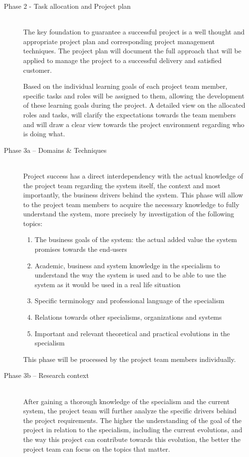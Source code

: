  \begin{description}
	\item [Phase 2 - Task allocation and Project plan]~\\
		The key foundation to guarantee a successful project is a well thought and appropriate project plan and corresponding project management techniques.
		The project plan will document the full approach that will be applied to manage the project to a successful delivery and satisfied customer.
		
		Based on the individual learning goals of each project team member, specific tasks and roles will be assigned to them, allowing the development of these learning goals during the project.
		A detailed view on the allocated roles and tasks, will clarify the expectations towards the team members and will draw a clear view towards the project environment regarding who is doing what.
	\item [Phase 3a -- Domains \& Techniques]~\\
		Project success has a direct interdependency with the actual knowledge of the project team regarding the system itself, the context and most importantly, the business drivers behind the system.
		This phase will allow to the project team members to acquire the necessary knowledge to fully understand  the system, more precisely by investigation of the following topics:

 		\begin{enumerate}
			\item The business goals of the system: the actual added value the system promises towards the end-users
			\item Academic, business and system knowledge in the specialism to understand the way the system is used and to be able to use  the system as it would be used in a real life situation
			\item Specific terminology and professional language of the specialism
			\item Relations towards other specialisms, organizations and systems
			\item Important and relevant theoretical and practical evolutions in the specialism
		\end {enumerate}

		This phase will be processed by the project team members individually.
 	\item [Phase 3b -- Research context]~\\
		After gaining a thorough knowledge of the specialism and the current system, the project team will further analyze the specific drivers behind the project requirements.
		The higher the understanding of the goal of the project in relation to the specialism, including the current evolutions, and the way this project can contribute towards this evolution, the better the project team can focus on the topics that matter.
	

\end{description}
